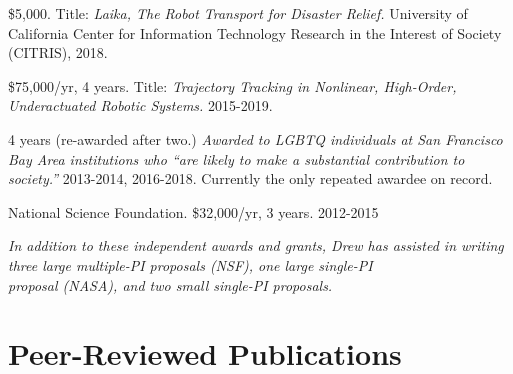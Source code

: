 \documentclass[letterpaper]{deedy-resume} %
\begin{document}
\vspace{0.2cm}


\begin{etaremune}

\item{} \$5,000. Title: {\it Laika, The Robot Transport for Disaster Relief.} University of California Center for Information Technology Research in the Interest of Society (CITRIS), 2018.
  
\item {} \$75,000/yr, 4 years. Title: {\it Trajectory Tracking in Nonlinear, High-Order, Underactuated Robotic Systems.} 2015-2019.

\item {} 4 years (re-awarded after two.) {\it Awarded to LGBTQ individuals at San Francisco Bay Area institutions who ``are likely to make a substantial contribution to society.''} 2013-2014, 2016-2018. Currently the only repeated awardee on record.

\item {} National Science Foundation. \$32,000/yr, 3 years. 2012-2015

\end{etaremune}

\vspace{-0.2cm}
\hspace{1cm} {\small \it *In addition to these independent awards and grants, Drew has assisted in writing three large multiple-PI proposals (NSF), one large single-PI\\ \hspace{1cm} proposal (NASA), and two small single-PI proposals.}




\vspace{0.2cm}
\section{Peer-Reviewed Publications}
\vspace{0.2cm}
\end{document}
